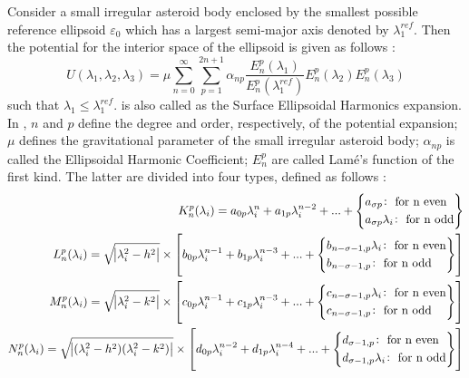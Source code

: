 Consider a small irregular asteroid body enclosed by the smallest possible reference ellipsoid $\varepsilon_0$ which has a largest semi-major axis denoted by $\lambda_1^{ref}$. Then the potential for the interior space of the ellipsoid is given as follows \cite{ellipse_colorado}:
\begin{equation}
\label{ellipse_internal}
U(\lambda_1, \lambda_2, \lambda_3) = \mu \sum_{n=0}^{\infty} \sum_{p=1}^{2n+1} \alpha_{np} \frac{E_n^p(\lambda_1)}{E_n^p(\lambda_1^{ref})} E_n^p(\lambda_2) E_n^p(\lambda_3)
\end{equation}
%
such that $\lambda_1 \leq \lambda_1^{ref}$.  is also called as the Surface Ellipsoidal Harmonics expansion. In , $n$ and $p$ define the degree and order, respectively, of the potential expansion; $\mu$ defines the gravitational parameter of the small irregular asteroid body; $\alpha_{np}$ is called the Ellipsoidal Harmonic Coefficient; $E_n^p$ are called Lam\' e's function of the first kind. The latter are divided into four types, defined as follows \cite{ellipse_colorado}:
\begin{align}
\label{lame's_K}
K_n^p(\lambda_i) = a_{0p}\lambda_i^n + a_{1p}\lambda_i^{n-2} + ... +
\left\{
		\begin{aligned}
		& a_{\sigma p} \colon \text{ for n even}\\
		& a_{\sigma p}\lambda_i \colon \text{ for n odd}
		\end{aligned}
\right\}\\
\label{lame's_L}
L_n^p(\lambda_i) = \sqrt{\abs{\lambda_i^2 - h^2}} \times \left[b_{0p}\lambda_i^{n-1} + b_{1p}\lambda_i^{n-3} + ... +
\left\{
		\begin{aligned}
		& b_{n-\sigma -1, p}\lambda_i \colon \text{ for n even}\\
		& b_{n-\sigma -1, p} \colon \text{ for n odd}
		\end{aligned}
\right\}\right]\\
\label{lame's_M}
M_n^p(\lambda_i) = \sqrt{\abs{\lambda_i^2 - k^2}} \times \left[c_{0p}\lambda_i^{n-1} + c_{1p}\lambda_i^{n-3} + ... +
\left\{
		\begin{aligned}
		& c_{n-\sigma -1, p}\lambda_i \colon \text{ for n even}\\
		& c_{n-\sigma -1, p} \colon \text{ for n odd}
		\end{aligned}
\right\}\right]\\
\label{lame's_N}
N_n^p(\lambda_i) = \sqrt{\abs{(\lambda_i^2 - h^2)(\lambda_i^2 - k^2)}} \times \left[d_{0p}\lambda_i^{n-2} + d_{1p}\lambda_i^{n-4} + ... +
\left\{
		\begin{aligned}
		& d_{\sigma -1, p} \colon \text{ for n even}\\
		& d_{\sigma -1, p}\lambda_i \colon \text{ for n odd}
		\end{aligned}
\right\}\right]
\end{align}
